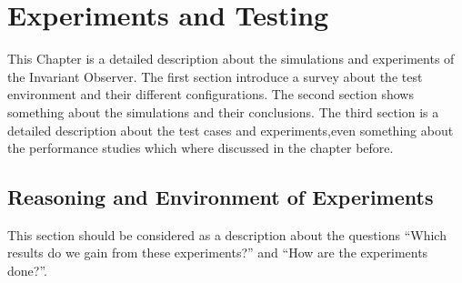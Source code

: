 \chapter{Experiments and Testing}
\label{chapter:4}

\ifpdf
    \graphicspath{{Chapter3/Figs/Raster/}{Chapter3/Figs/PDF/}{Chapter3/Figs/}}
\else
    \graphicspath{{Chapter3/Figs/Vector/}{Chapter3/Figs/}}
\fi

This Chapter is a detailed description about the simulations and experiments of the Invariant Observer.
The first section introduce a survey about the test environment and their different configurations.
The second section shows something about the simulations and their conclusions.
The third section is a detailed description about the test cases and experiments,even something about the performance studies which where
discussed in the chapter before. \\



\section{Reasoning and Environment of Experiments}
\label{chapter:4:section:1}
This section should be considered as a description about the questions ``Which results do we gain from these experiments?'' and ``How are the experiments done?''. 

